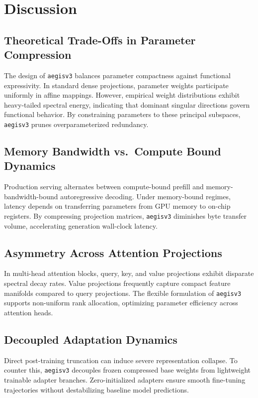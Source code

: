 \section{Discussion}

\subsection{Theoretical Trade-Offs in Parameter Compression}
The design of \texttt{aegisv3} balances parameter compactness against functional expressivity. In standard dense projections, parameter weights participate uniformly in affine mappings. However, empirical weight distributions exhibit heavy-tailed spectral energy, indicating that dominant singular directions govern functional behavior. By constraining parameters to these principal subspaces, \texttt{aegisv3} prunes overparameterized redundancy.

\subsection{Memory Bandwidth vs.\ Compute Bound Dynamics}
Production serving alternates between compute-bound prefill and memory-bandwidth-bound autoregressive decoding. Under memory-bound regimes, latency depends on transferring parameters from GPU memory to on-chip registers. By compressing projection matrices, \texttt{aegisv3} diminishes byte transfer volume, accelerating generation wall-clock latency.

\subsection{Asymmetry Across Attention Projections}
In multi-head attention blocks, query, key, and value projections exhibit disparate spectral decay rates. Value projections frequently capture compact feature manifolds compared to query projections. The flexible formulation of \texttt{aegisv3} supports non-uniform rank allocation, optimizing parameter efficiency across attention heads.

\subsection{Decoupled Adaptation Dynamics}
Direct post-training truncation can induce severe representation collapse. To counter this, \texttt{aegisv3} decouples frozen compressed base weights from lightweight trainable adapter branches. Zero-initialized adapters ensure smooth fine-tuning trajectories without destabilizing baseline model predictions.

